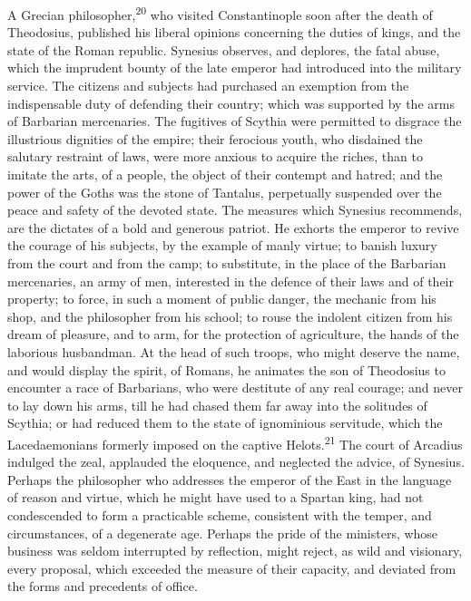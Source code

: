 A Grecian philosopher,\textsuperscript{20} who visited Constantinople soon after
the death of Theodosius, published his liberal opinions
concerning the duties of kings, and the state of the Roman
republic. Synesius observes, and deplores, the fatal abuse, which
the imprudent bounty of the late emperor had introduced into the
military service. The citizens and subjects had purchased an
exemption from the indispensable duty of defending their country;
which was supported by the arms of Barbarian mercenaries. The
fugitives of Scythia were permitted to disgrace the illustrious
dignities of the empire; their ferocious youth, who disdained the
salutary restraint of laws, were more anxious to acquire the
riches, than to imitate the arts, of a people, the object of
their contempt and hatred; and the power of the Goths was the
stone of Tantalus, perpetually suspended over the peace and
safety of the devoted state. The measures which Synesius
recommends, are the dictates of a bold and generous patriot. He
exhorts the emperor to revive the courage of his subjects, by the
example of manly virtue; to banish luxury from the court and from
the camp; to substitute, in the place of the Barbarian
mercenaries, an army of men, interested in the defence of their
laws and of their property; to force, in such a moment of public
danger, the mechanic from his shop, and the philosopher from his
school; to rouse the indolent citizen from his dream of pleasure,
and to arm, for the protection of agriculture, the hands of the
laborious husbandman. At the head of such troops, who might
deserve the name, and would display the spirit, of Romans, he
animates the son of Theodosius to encounter a race of Barbarians,
who were destitute of any real courage; and never to lay down his
arms, till he had chased them far away into the solitudes of
Scythia; or had reduced them to the state of ignominious
servitude, which the Lacedaemonians formerly imposed on the
captive Helots.\textsuperscript{21} The court of Arcadius indulged the zeal,
applauded the eloquence, and neglected the advice, of Synesius.
Perhaps the philosopher who addresses the emperor of the East in
the language of reason and virtue, which he might have used to a
Spartan king, had not condescended to form a practicable scheme,
consistent with the temper, and circumstances, of a degenerate
age. Perhaps the pride of the ministers, whose business was
seldom interrupted by reflection, might reject, as wild and
visionary, every proposal, which exceeded the measure of their
capacity, and deviated from the forms and precedents of office.
